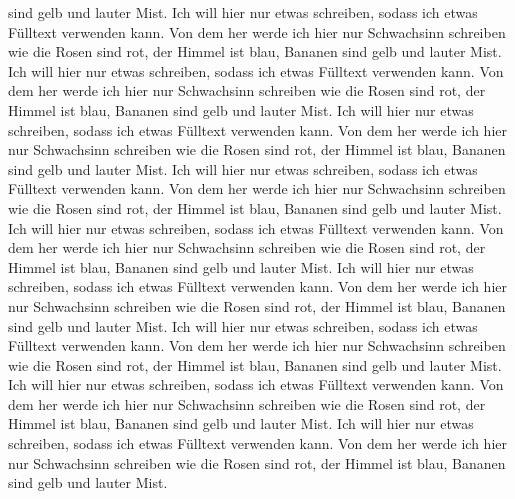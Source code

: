 sind gelb und lauter Mist. Ich will hier nur etwas schreiben, sodass ich etwas Fülltext verwenden kann. Von dem her werde ich hier nur Schwachsinn schreiben wie die Rosen sind rot, der Himmel ist blau, Bananen sind gelb und lauter Mist. Ich will hier nur etwas schreiben, sodass ich etwas Fülltext verwenden kann. Von dem her werde ich hier nur Schwachsinn schreiben wie die Rosen sind rot, der Himmel ist blau, Bananen sind gelb und lauter Mist. Ich will hier nur etwas schreiben, sodass ich etwas Fülltext verwenden kann. Von dem her werde ich hier nur Schwachsinn schreiben wie die Rosen sind rot, der Himmel ist blau, Bananen sind gelb und lauter Mist. Ich will hier nur etwas schreiben, sodass ich etwas Fülltext verwenden kann. Von dem her werde ich hier nur Schwachsinn schreiben wie die Rosen sind rot, der Himmel ist blau, Bananen sind gelb und lauter Mist. Ich will hier nur etwas schreiben, sodass ich etwas Fülltext verwenden kann. Von dem her werde ich hier nur Schwachsinn schreiben wie die Rosen sind rot, der Himmel ist blau, Bananen sind gelb und lauter Mist. Ich will hier nur etwas schreiben, sodass ich etwas Fülltext verwenden kann. Von dem her werde ich hier nur Schwachsinn schreiben wie die Rosen sind rot, der Himmel ist blau, Bananen sind gelb und lauter Mist. Ich will hier nur etwas schreiben, sodass ich etwas Fülltext verwenden kann. Von dem her werde ich hier nur Schwachsinn schreiben wie die Rosen sind rot, der Himmel ist blau, Bananen sind gelb und lauter Mist. Ich will hier nur etwas schreiben, sodass ich etwas Fülltext verwenden kann. Von dem her werde ich hier nur Schwachsinn schreiben wie die Rosen sind rot, der Himmel ist blau, Bananen sind gelb und lauter Mist. Ich will hier nur etwas schreiben, sodass ich etwas Fülltext verwenden kann. Von dem her werde ich hier nur Schwachsinn schreiben wie die Rosen sind rot, der Himmel ist blau, Bananen sind gelb und lauter Mist. 
